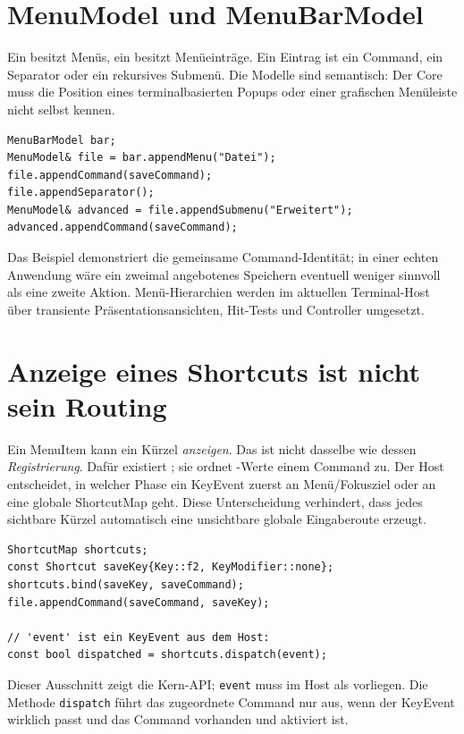 \section{MenuModel und MenuBarModel}
Ein  besitzt Menüs,
ein  besitzt Menüeinträge.
Ein Eintrag ist ein Command, ein Separator
oder ein rekursives Submenü. Die Modelle
sind semantisch: Der Core muss die Position
eines terminalbasierten Popups oder einer
grafischen Menüleiste nicht selbst kennen.

\begin{lstlisting}[language=SASDCpp,caption={Menübaum aufbauen}]
MenuBarModel bar;
MenuModel& file = bar.appendMenu("Datei");
file.appendCommand(saveCommand);
file.appendSeparator();
MenuModel& advanced = file.appendSubmenu("Erweitert");
advanced.appendCommand(saveCommand);
\end{lstlisting}
Das Beispiel demonstriert die gemeinsame
Command-Identität; in einer echten
Anwendung wäre ein zweimal angebotenes
Speichern eventuell weniger sinnvoll
als eine zweite Aktion. Menü-Hierarchien
werden im aktuellen Terminal-Host über
transiente Präsentationsansichten,
Hit-Tests und Controller umgesetzt.

\section{Anzeige eines Shortcuts ist nicht sein Routing}
Ein MenuItem kann ein Kürzel \emph{anzeigen}.
Das ist nicht dasselbe wie dessen
\emph{Registrierung}. Dafür existiert
; sie ordnet
-Werte einem Command zu.
Der Host entscheidet, in welcher Phase
ein KeyEvent zuerst an Menü/Fokusziel
oder an eine globale ShortcutMap geht.
Diese Unterscheidung verhindert, dass
jedes sichtbare Kürzel automatisch
eine unsichtbare globale Eingaberoute erzeugt.

\begin{lstlisting}[language=SASDCpp]
ShortcutMap shortcuts;
const Shortcut saveKey{Key::f2, KeyModifier::none};
shortcuts.bind(saveKey, saveCommand);
file.appendCommand(saveCommand, saveKey);

// 'event' ist ein KeyEvent aus dem Host:
const bool dispatched = shortcuts.dispatch(event);
\end{lstlisting}
Dieser Ausschnitt zeigt die Kern-API;
\texttt{event} muss im Host als
 vorliegen. Die Methode
\texttt{dispatch} führt das zugeordnete
Command nur aus, wenn der KeyEvent wirklich
passt und das Command vorhanden und
aktiviert ist.


